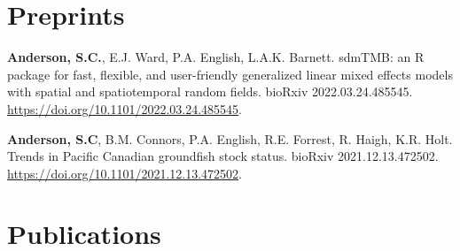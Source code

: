 \section{Preprints}\label{preprints}

\begin{description}
\tightlist
\item[2022]
\textbf{Anderson, S.C.}, E.J. Ward, P.A. English, L.A.K. Barnett.
sdmTMB: an R package for fast, flexible, and user-friendly generalized
linear mixed effects models with spatial and spatiotemporal random
fields. bioRxiv 2022.03.24.485545.
\url{https://doi.org/10.1101/2022.03.24.485545}.
\item[2021]
\textbf{Anderson, S.C}, B.M. Connors, P.A. English, R.E. Forrest, R.
Haigh, K.R. Holt. Trends in Pacific Canadian groundfish stock status.
bioRxiv 2021.12.13.472502.
\url{https://doi.org/10.1101/2021.12.13.472502}.
\end{description}

\section{Publications}\label{publications}

